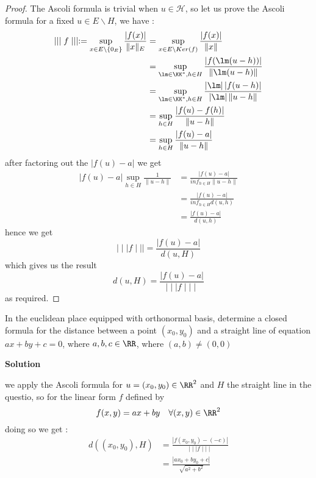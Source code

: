 \begin{proof}
The Ascoli formula is trivial when $u \in \mathcal{H}  $, so let us prove the Ascoli 
formula for a fixed $u \in E \backslash H $, we have : 
\begin{align*}
\mid \mid \mid  f \mid \mid \mid  := 
\sup_{x \in E \backslash \left\{ 0_{E} \right\}}  
\frac{\left| f(x)  \right|}{\| x \| _{E}} &=
\sup_{ x \in E  \backslash  Ker(f) } 
\frac{\left| f(x)  \right|}{\| x \| }  \\
					  &= 
					  \sup_{ \lm \in \KK^{*}, h \in H}  
					 \frac{\left| f(\lm (u-h) )  \right|}{
					 \| \lm (u-h)  \| } 
					 \\
					  &= \sup_{\lm \in  \KK^{*}, h \in H}  
					 \frac{\left| \lm \right| \left| f(u-h)  \right|}{\left| \lm \right|
					\| u-h \| }
					\\
				&= 
				\sup_{ h \in H} 
				\frac{\left| f(u) - f(h)  \right|}{\| u-h \| } 
				\\
				&= 
				\sup_{h \in  H}  
				\frac{\left| f(u) - a \right|}{\| u-h \| }
\end{align*}
after factoring out the $\left| f(u)  - a \right| $  we get 
\begin{align*}
	\left| f(u) -a \right| 
	\sup_{h \in  H}  
	\frac{1}{\| u-h \| }&=
	\frac{\left| f(u) -a \right|}{inf_{h \in H} \| u-h \| }
	\\
			    &=
			    \frac{\left| f(u) -a \right|}{ inf_{h \in H} d(u,h) } \\
			    &= 
			    \frac{\left| f(u) -a \right|}{d(u,h) } 
\end{align*}
hence we get 
\[
\mid \mid \mid  f \mid \mid \mid  = 
\frac{\left| f(u) - a \right|}{d(u,H) }
\]
which gives us the result 
\[
	d(u,H)  = 
	\frac{\left| f(u) -a \right|}{\mid \mid \mid  f \mid \mid \mid }
\]
as required.
\end{proof}
In the euclidean place equipped with orthonormal basis, determine 
a closed formula for the distance between a point $(x_0,y_0)$ and a straight 
line of equation $ax + by + c = 0 $, where $a,b,c \in \RR $, where 
$(a,b) \neq (0,0) $
\begin{center}
	\textbf{Solution}
\end{center}
we apply the Ascoli formula for 
$u = \left( x_0,y_0 \right) \in \RR ^2  $  and 
$H $ the straight line in the questio, so for the linear form 
$f $ defined by 
\[
f(x,y) = ax + by \quad 
\forall   (x,y) \in  \RR ^2  
\]
doing so we get : 
\begin{align*}
	d \left( (x_0,y_0) , H \right)  &=
	\frac{\left| f(x_0,y_0) - (-c)  \right|}{ \mid \mid \mid   f \mid \mid \mid } 
	\\
					&= 
					\frac{\left| ax_0+by_0 +c \right|}{
						\sqrt{a ^2  + b^2 } 
					}
\end{align*}
% 
